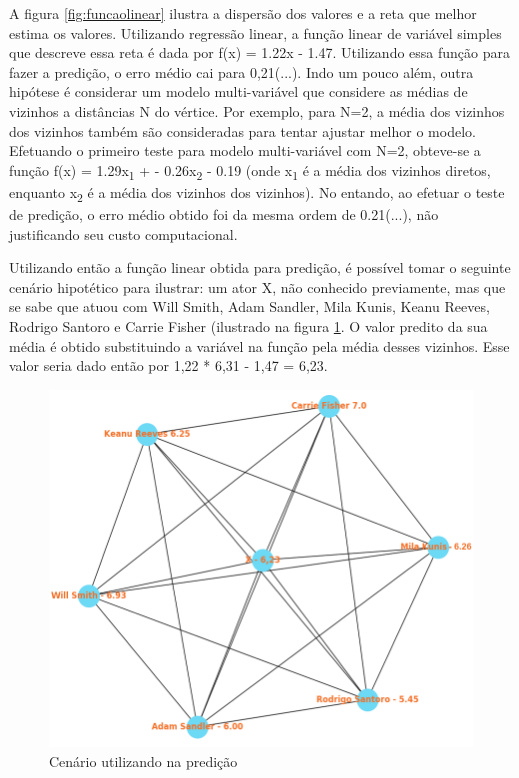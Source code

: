 A figura \ref{fig:funcaolinear} ilustra a dispersão dos valores e a reta que melhor estima os valores. Utilizando regressão linear, a função linear de variável simples que descreve essa reta é dada por f(x) = 1.22x - 1.47. Utilizando essa função para fazer a predição, o erro médio cai para 0,21(...). 
Indo um pouco além, outra hipótese é considerar um modelo multi-variável que considere as médias de vizinhos a distâncias N do vértice. Por exemplo, para N=2, a média dos vizinhos dos vizinhos também são consideradas para tentar ajustar melhor o modelo. Efetuando o primeiro teste para modelo multi-variável com N=2, obteve-se a função f(x) = 1.29x\textsubscript{1} + - 0.26x\textsubscript{2} - 0.19 (onde x\textsubscript{1} é a média dos vizinhos diretos, enquanto x\textsubscript{2} é a média dos vizinhos dos vizinhos). No entando, ao efetuar o teste de predição, o erro médio obtido foi da mesma ordem de 0.21(...), não justificando seu custo computacional.

Utilizando então a função linear obtida para predição, é possível tomar o seguinte cenário hipotético para ilustrar: um ator X, não conhecido previamente, mas que se sabe que atuou com Will Smith, Adam Sandler, Mila Kunis, Keanu Reeves, Rodrigo Santoro e Carrie Fisher (ilustrado na figura \ref{fig:predict}. O valor predito da sua média é obtido substituindo a variável na função pela média desses vizinhos. Esse valor seria dado então por 1,22 * 6,31 - 1,47 = 6,23.


\begin{figure}[!htb]
\centering
\includegraphics[width=16cm]{img/predict.png}
\caption{Cenário utilizando na predição}
\label{fig:predict}
\end{figure}
